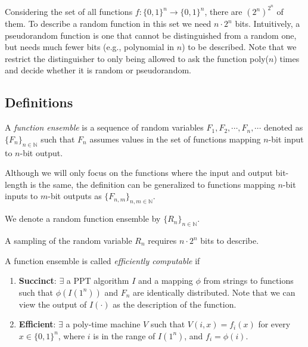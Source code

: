 Considering the set of all functions $f: \{0, 1\}^n \rightarrow \{0, 1\}^n$, there are $(2^n)^{2^n}$ of them.
To describe a random function in this set we need $n \cdot 2^n$ bits.
Intuitively, a pseudorandom function is one that cannot be distinguished from a random one,
but needs much fewer bits (e.g., polynomial in $n$) to be described.
Note that we restrict the distinguisher to only being allowed to ask the function poly($n$) times and decide whether it is random or pseudorandom.

\subsection{Definitions}

\begin{definition}
    A \emph{function ensemble} is a sequence of random variables $F_1, F_2, \cdots, F_n, \cdots$ denoted as $\{F_n\}_{n \in \mathbb{N}}$ such that
    $F_n$ assumes values in the set of functions mapping $n$-bit input to $n$-bit output.
\end{definition}
Although we will only focus on the functions where the input and output bit-length is the same, the definition can be generalized to functions mapping $n$-bit inputs to $m$-bit outputs as $\{F_{n, m}\}_{n, m \in \mathbb{N}}$.

\begin{definition}
    We denote a random function ensemble by $\{R_n\}_{n \in \mathbb{N}}$.
\end{definition}
A sampling of the random variable $R_n$ requires $n \cdot 2^n$ bits to describe.

\begin{definition}
    A function ensemble is called \emph{efficiently computable} if
    \begin{enumerate}[label=(\alph*)]
        \item \textbf{Succinct}:
              $\exists$ a PPT algorithm $I$ and a mapping $\phi$ from strings to functions such that
              $\phi(I(1^n))$ and $F_n$ are identically distributed.
              Note that we can view the output of $I(\cdot)$ as the description of the function.
        \item \textbf{Efficient}:
              $\exists$ a poly-time machine $V$ such that
              $V(i, x) = f_i(x)$ for every $x \in \{0, 1\}^n$, where $i$ is in the range of $I(1^n)$, and $f_i = \phi(i)$.
    \end{enumerate}
\end{definition}

